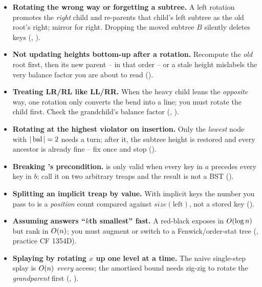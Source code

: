 \begin{itemize}[nosep, leftmargin=1.4em]
  \item \textbf{Rotating the wrong way or forgetting a subtree.} A left rotation promotes the \emph{right}
        child and re-parents that child's left subtree as the old root's right; mirror for right. Dropping
        the moved subtree $B$ silently deletes keys (, ).
  \item \textbf{Not updating heights bottom-up after a rotation.} Recompute the \emph{old} root first, then
        its new parent -- in that order -- or a stale height mislabels the very balance factor you are about
        to read ().
  \item \textbf{Treating LR/RL like LL/RR.} When the heavy child leans the \emph{opposite} way, one rotation
        only converts the bend into a line; you must rotate the child first. Check the grandchild's balance
        factor (, ).
  \item \textbf{Rotating at the highest violator on insertion.} Only the \emph{lowest} node with
        $|\operatorname{bal}|=2$ needs a turn; after it, the subtree height is restored and every ancestor is already fine
        -- fix once and stop ().
  \item \textbf{Breaking 's precondition.}  is only valid when every key in $a$
        precedes every key in $b$; call it on two arbitrary treaps and the result is not a BST
        ().
  \item \textbf{Splitting an implicit treap by value.} With implicit keys the number you pass to 
        is a \emph{position} count compared against $\mathit{size}(\text{left})$, not a stored key
        ().
  \item \textbf{Assuming  answers ``$k$th smallest'' fast.} A red-black  exposes
         in $O(\log n)$ but rank in $O(n)$; you must augment or switch to a
        Fenwick/order-stat tree (, practice CF 1354D).
  \item \textbf{Splaying by rotating $x$ up one level at a time.} The naive single-step splay is
        $O(n)$ \emph{every} access; the amortised bound needs zig-zig to rotate the \emph{grandparent}
        first (, ).
\end{itemize}

